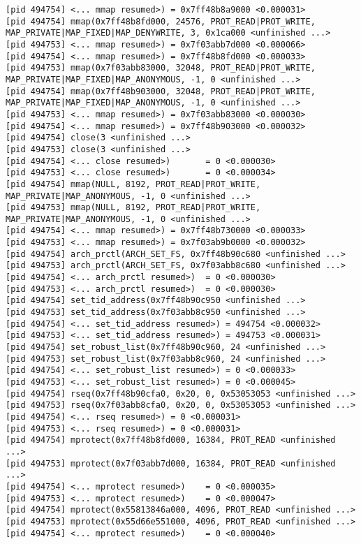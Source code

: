 \documentclass[a4paper, 12pt]{article}
\begin{document}
\begin{lstlisting}
[pid 494754] <... mmap resumed>) = 0x7ff48b8a9000 <0.000031>
[pid 494754] mmap(0x7ff48b8fd000, 24576, PROT_READ|PROT_WRITE, MAP_PRIVATE|MAP_FIXED|MAP_DENYWRITE, 3, 0x1ca000 <unfinished ...>
[pid 494753] <... mmap resumed>) = 0x7f03abb7d000 <0.000066>
[pid 494754] <... mmap resumed>) = 0x7ff48b8fd000 <0.000033>
[pid 494753] mmap(0x7f03abb83000, 32048, PROT_READ|PROT_WRITE, MAP_PRIVATE|MAP_FIXED|MAP_ANONYMOUS, -1, 0 <unfinished ...>
[pid 494754] mmap(0x7ff48b903000, 32048, PROT_READ|PROT_WRITE, MAP_PRIVATE|MAP_FIXED|MAP_ANONYMOUS, -1, 0 <unfinished ...>
[pid 494753] <... mmap resumed>) = 0x7f03abb83000 <0.000030>
[pid 494754] <... mmap resumed>) = 0x7ff48b903000 <0.000032>
[pid 494754] close(3 <unfinished ...>
[pid 494753] close(3 <unfinished ...>
[pid 494754] <... close resumed>)       = 0 <0.000030>
[pid 494753] <... close resumed>)       = 0 <0.000034>
[pid 494754] mmap(NULL, 8192, PROT_READ|PROT_WRITE, MAP_PRIVATE|MAP_ANONYMOUS, -1, 0 <unfinished ...>
[pid 494753] mmap(NULL, 8192, PROT_READ|PROT_WRITE, MAP_PRIVATE|MAP_ANONYMOUS, -1, 0 <unfinished ...>
[pid 494754] <... mmap resumed>) = 0x7ff48b730000 <0.000033>
[pid 494753] <... mmap resumed>) = 0x7f03ab9b0000 <0.000032>
[pid 494754] arch_prctl(ARCH_SET_FS, 0x7ff48b90c680 <unfinished ...>
[pid 494753] arch_prctl(ARCH_SET_FS, 0x7f03abb8c680 <unfinished ...>
[pid 494754] <... arch_prctl resumed>)  = 0 <0.000030>
[pid 494753] <... arch_prctl resumed>)  = 0 <0.000030>
[pid 494754] set_tid_address(0x7ff48b90c950 <unfinished ...>
[pid 494753] set_tid_address(0x7f03abb8c950 <unfinished ...>
[pid 494754] <... set_tid_address resumed>) = 494754 <0.000032>
[pid 494753] <... set_tid_address resumed>) = 494753 <0.000031>
[pid 494754] set_robust_list(0x7ff48b90c960, 24 <unfinished ...>
[pid 494753] set_robust_list(0x7f03abb8c960, 24 <unfinished ...>
[pid 494754] <... set_robust_list resumed>) = 0 <0.000033>
[pid 494753] <... set_robust_list resumed>) = 0 <0.000045>
[pid 494754] rseq(0x7ff48b90cfa0, 0x20, 0, 0x53053053 <unfinished ...>
[pid 494753] rseq(0x7f03abb8cfa0, 0x20, 0, 0x53053053 <unfinished ...>
[pid 494754] <... rseq resumed>) = 0 <0.000031>
[pid 494753] <... rseq resumed>) = 0 <0.000031>
[pid 494754] mprotect(0x7ff48b8fd000, 16384, PROT_READ <unfinished ...>
[pid 494753] mprotect(0x7f03abb7d000, 16384, PROT_READ <unfinished ...>
[pid 494754] <... mprotect resumed>)    = 0 <0.000035>
[pid 494753] <... mprotect resumed>)    = 0 <0.000047>
[pid 494754] mprotect(0x55813846a000, 4096, PROT_READ <unfinished ...>
[pid 494753] mprotect(0x55d66e551000, 4096, PROT_READ <unfinished ...>
[pid 494754] <... mprotect resumed>)    = 0 <0.000040>

\end{lstlisting}
\end{document}

